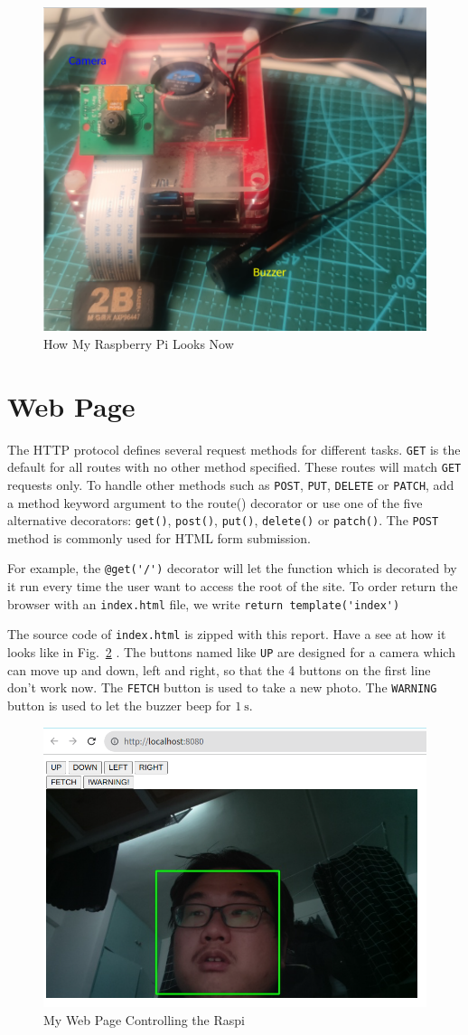 \documentclass{article}
\begin{document}
\begin{figure}[!h]
	\centering
	\includegraphics[width=2 in]{../pic/raspi-2.png}
	\caption{How My Raspberry Pi Looks Now}
	\label{fig:raspi-2}
\end{figure}

\newpage

\section{Web Page}
The HTTP protocol defines several request methods for different tasks. \verb|GET| is the default for all routes with no other method specified. These routes will match \verb|GET| requests only. To handle other methods such as \verb|POST|, \verb|PUT|, \verb|DELETE| or \verb|PATCH|, add a method keyword argument to the route() decorator or use one of the five alternative decorators: \verb|get()|, \verb|post()|, \verb|put()|, \verb|delete()| or \verb|patch()|. The \verb|POST| method is commonly used for HTML form submission.

For example, the \verb|@get('/')| decorator will let the function which is decorated by it run every time the user want to access the root of the site. To order return the browser with an \verb|index.html| file, we write \verb|return template('index')|

The source code of \verb|index.html| is zipped with this report. Have a see at how it looks like in Fig.~\ref{fig:webcontrol-page} . The buttons named like \verb|UP| are designed for a camera which can move up and down, left and right, so that the 4 buttons on the first line don't work now. The \verb|FETCH| button is used to take a new photo. The \verb|WARNING| button is used to let the buzzer beep for $1 ~\mathrm{s}$.

\begin{figure}[!h]
	\centering
	\includegraphics[width=2.5 in]{../pic/webcontrol-page.png}
	\caption{My Web Page Controlling the Raspi}
	\label{fig:webcontrol-page}
\end{figure}
\end{document}
